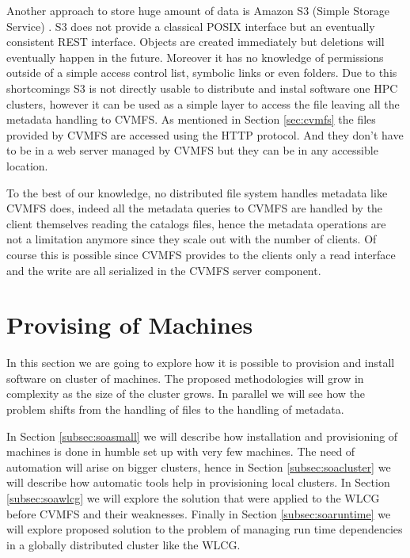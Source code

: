 Another approach to store huge amount of data is Amazon S3 (Simple
Storage Service) \cite{aws-s3}. S3 does not provide a classical POSIX interface
but an eventually consistent REST interface. Objects are created immediately
but deletions will eventually happen in the future. Moreover it has no knowledge
of permissions outside of a simple access control list, symbolic links or even
folders. Due to this shortcomings S3 is not directly usable to distribute and
instal software one HPC clusters, however it can be used as a simple layer to
access the file leaving all the metadata handling to CVMFS. As mentioned in
Section \ref{sec:cvmfs} the files provided by CVMFS are accessed using the HTTP
protocol. And they don't have to be in a web server managed by CVMFS but they can
be in any accessible location.

To the best of our knowledge, no distributed file system handles metadata like
CVMFS does, indeed all the metadata queries to CVMFS are handled by the client
themselves reading the catalogs files, hence the metadata operations are not a
limitation anymore since they scale out with the number of clients. Of course
this is possible since CVMFS provides to the clients only a read interface and
the write are all serialized in the CVMFS server component.

\section{Provising of Machines} \label{sec:provisioning}

In this section we are going to explore how it is possible to provision and
install software on cluster of machines. The proposed methodologies will grow
in complexity as the size of the cluster grows. In parallel we will see how the
problem shifts from the handling of files to the handling of metadata.

In Section \ref{subsec:soasmall} we will describe how installation and
provisioning of machines is done in humble set up with very few machines. The
need of automation will arise on bigger clusters, hence in Section
\ref{subsec:soacluster} we will describe how automatic tools help in
provisioning local clusters. In Section \ref{subsec:soawlcg} we will explore
the solution that were applied to the WLCG before CVMFS and their weaknesses.
Finally in Section \ref{subsec:soaruntime} we will explore proposed solution to
the problem of managing run time dependencies in a globally distributed cluster
like the WLCG.

